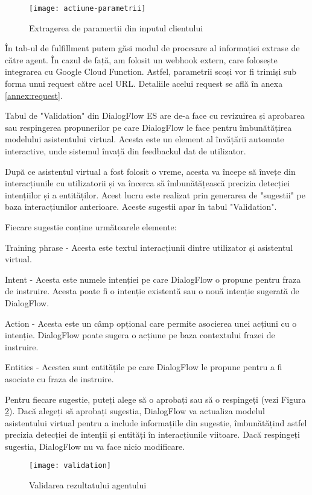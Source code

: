 \begin{figure}[h]
    \centering
    \texttt{[image: actiune-parametrii]}
    \caption{Extragerea de paramertii din inputul clientului}
    \label{fig:actiune-parametrii}
\end{figure}

În tab-ul de fulfillment putem găsi modul de procesare al informației extrase de către agent. În cazul de față, am folosit un webhook extern, care folosește integrarea cu Google Cloud Function. Astfel, parametrii scoși vor fi trimiși sub forma unui request către acel URL. Detaliile acelui request se află în anexa \ref{annex:request}.

Tabul de "Validation" din DialogFlow ES are de-a face cu revizuirea și aprobarea sau respingerea propunerilor pe care DialogFlow le face pentru îmbunătățirea modelului asistentului virtual. Acesta este un element al învățării automate interactive, unde sistemul învață din feedbackul dat de utilizator.

După ce asistentul virtual a fost folosit o vreme, acesta va începe să învețe din interacțiunile cu utilizatorii și va încerca să îmbunătățească precizia detecției intențiilor și a entităților. Acest lucru este realizat prin generarea de "sugestii" pe baza interacțiunilor anterioare. Aceste sugestii apar în tabul "Validation".

Fiecare sugestie conține următoarele elemente:

Training phrase - Acesta este textul interacțiunii dintre utilizator și asistentul virtual.

Intent - Acesta este numele intenției pe care DialogFlow o propune pentru fraza de instruire. Acesta poate fi o intenție existentă sau o nouă intenție sugerată de DialogFlow.

Action - Acesta este un câmp opțional care permite asocierea unei acțiuni cu o intenție. DialogFlow poate sugera o acțiune pe baza contextului frazei de instruire.

Entities - Acestea sunt entitățile pe care DialogFlow le propune pentru a fi asociate cu fraza de instruire.

Pentru fiecare sugestie, puteți alege să o aprobați sau să o respingeți (vezi Figura \ref{fig:validation}). Dacă alegeți să aprobați sugestia, DialogFlow va actualiza modelul asistentului virtual pentru a include informațiile din sugestie, îmbunătățind astfel precizia detecției de intenții și entități în interacțiunile viitoare. Dacă respingeți sugestia, DialogFlow nu va face nicio modificare.

\begin{figure}[h]
    \centering
    \texttt{[image: validation]}
    \caption{Validarea rezultatului agentului}
    \label{fig:validation}
\end{figure}